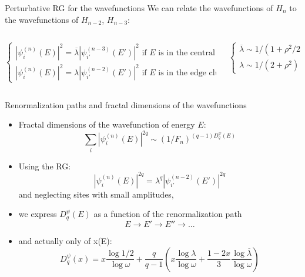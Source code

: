 \documentclass[xcolor=x11names,compress,professionalfonts]{beamer}
\renewcommand{\(}{\begin{columns}}
\renewcommand{\)}{\end{columns}}
\newcommand{\<}[1]{\begin{column}{#1}}
\renewcommand{\>}{\end{column}}
\newcommand{\lb}{\ensuremath{\overline{\lambda}}}
\begin{document}
\begin{frame}{Perturbative RG for the wavefunctions}
We can relate the wavefunctions of $H_n$ to the wavefunctions of $H_{n-2}$, $H_{n-3}$:
	
	\centering
	
	
\begin{columns}
	\begin{column}{9cm}
	\[
	\begin{cases}
		|\psi_i^{(n)}(E)|^2 = \lb |\psi_{i'}^{(n-3)}(E')|^2 \text{~if $E$ is in the central cluster}\\
		|\psi_i^{(n)}(E)|^2 = \lambda |\psi_{i'}^{(n-2)}(E')|^2 \text{~if }E\text{~is in the edge clusters}
	\end{cases}
	\]
	\end{column}
	\begin{column}{3cm}
	\[
	\begin{cases}
		\lb \sim  1/(1+\rho^2/2) \\
		\lambda \sim 1/(2+\rho^2)
	\end{cases}
	\]
	\end{column}
\end{columns}
\end{frame}

\begin{frame}{Renormalization paths and fractal dimensions of the wavefunctions}
\begin{itemize}
	\item Fractal dimensions of the wavefunction of energy $E$:
	\[ \sum_i |\psi_i^{(n)}(E)|^{2q} \sim (1/F_n)^{(q-1)D_q^\psi(E)}  \]
	\item Using the RG:
		\[ |\psi_i^{(n)}(E)|^{2q} = \lambda^q |\psi_{i'}^{(n-2)}(E')|^{2q} \]
		and neglecting sites with small amplitudes,
	\item we express $D_q^\psi(E)$ as a function of the renormalization path
	\[ E \rightarrow E' \rightarrow E'' \rightarrow ... \]
	\item and actually only of x(E):
	\[ D_q^\psi(x) = x \frac{\log 1/2}{\log \omega} + \frac{q}{q-1} \left( x \frac{\log \lambda}{\log \omega} + \frac{1-2x}{3}\frac{\log \lb}{\log \omega} \right) \]
\end{itemize}
\end{frame}
\end{document}

